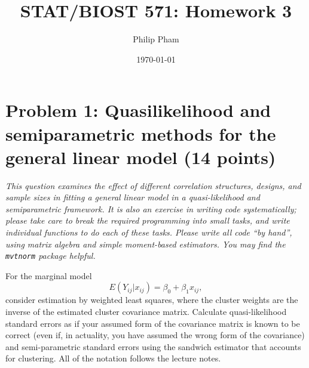 \documentclass[11pt, letterpaper]{article}
\title{STAT/BIOST 571: Homework 3}
\author{Philip Pham}
\date{\today}
\begin{document}
\maketitle

\section*{Problem 1: Quasilikelihood and semiparametric methods for the general linear model (14 points)}
{\em This question examines the effect of different correlation structures, designs, and sample sizes in fitting a general linear model in a quasi-likelihood and semiparametric framework.  It is also an exercise in writing code systematically; please take care to break the required programming into small tasks, and write individual functions to do each of these tasks.
Please write all code ``by hand'', using matrix algebra and simple moment-based estimators.  
You may find the \texttt{mvtnorm} package helpful.

For the marginal model
\[
E(Y_{ij}|x_{ij}) = \beta_0 + \beta_1 x_{ij},
\]
consider estimation by weighted least squares, where the cluster weights are the inverse of
the estimated cluster covariance matrix.  Calculate quasi-likelihood standard errors as if your assumed form
of the covariance matrix
is known to be correct (even if, in actuality, you have assumed the wrong form of the covariance) and semi-parametric  standard errors using the sandwich estimator that accounts for clustering.
All of the notation follows the lecture notes. 

}
\end{document}
